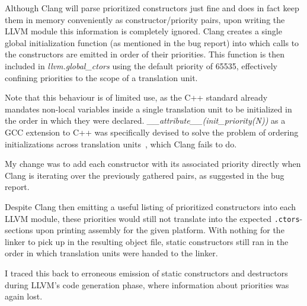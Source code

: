 Although Clang will parse prioritized constructors just fine and does in fact
keep them in memory conveniently as constructor/priority pairs, upon writing
the LLVM module this information is completely ignored. Clang creates a single
global initialization function (as mentioned in the bug report) into which
calls to the constructors are emitted in order of their priorities. This
function is then included in \emph{llvm.global\_ctors} using the default
priority of 65535, effectively confining priorities to the scope of
a translation unit.

\begin{framed}

Note that this behaviour is of limited use, as the C++ standard already
mandates non-local variables inside a single translation unit to be initialized
in the order in which they were declared.
\emph{\_\_attribute\_\_(init\_priority(N))} as a GCC extension to C++ was
specifically devised to solve the problem of ordering initializations across
translation units~\cite{gcc-initpriority}, which Clang fails to do.


\end{framed}

My change was to add each constructor with its associated priority directly
when Clang is iterating over the previously gathered pairs, as suggested in the
bug report.


Despite Clang then emitting a useful listing of prioritized constructors into
each LLVM module, these priorities would still not translate into the expected
\texttt{.ctors}-sections upon printing assembly for the given platform.
With nothing for the linker to pick up in the
resulting object file, static constructors still ran in the order in which
translation units were handed to the linker.

I traced this back to erroneous emission of static constructors and destructors
during LLVM's code generation phase, where information about priorities was
again lost.


